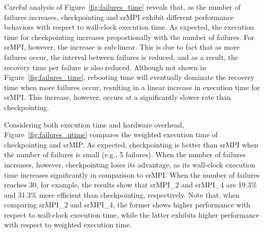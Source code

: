 Careful analysis of Figure~\ref{fig:failures_time} reveals that, as the number of failures increases, checkpointing and srMPI exhibit different performance behaviors with respect to wall-clock execution time. As expected, the execution time for checkpointing increases proportionally with the number of failures. For srMPI, however, the increase is sub-linear. This is due to fact that as more failures occur, the interval between failures is reduced, and as a result, the recovery time per failure is also reduced. Although not shown in Figure~\ref{fig:failures_time}, rebooting time will eventually dominate the recovery time when more failures occur, resulting in a linear increase in execution time for srMPI. This increase, however, occurs at a significantly slower rate than checkpointing.

Considering both execution time and hardware overhead, Figure~\ref{fig:failures_ntime} compares the weighted execution time of checkpointing and srMIP.  As expected, checkpointing is better than srMPI when the number of  failures is small (e.g., 5 failures).  When the number of failures increases,  however, checkpointing loses its advantage, as its wall-clock execution time increases significantly in comparison to srMPI.  When the number of failures reaches 30, for example, the results show that srMPI\_2 and srMPI\_4 are 19.3\% and 31.3\% more efficient than  checkpointing, respectively.
Note that, when comparing srMPI\_2 and srMPI\_4, the former shows higher performance with respect to wall-clock execution time, while the latter exhibits higher performance with respect to weighted execution time. 
